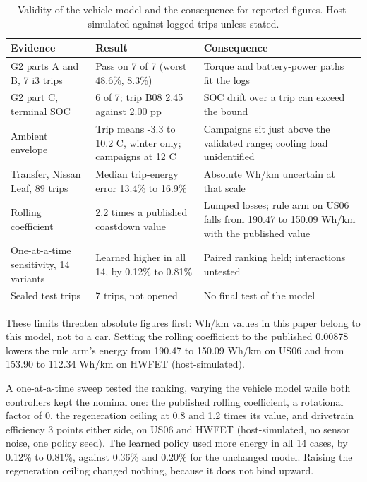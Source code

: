 \documentclass{ieeeaccess}
\begin{document}
\begin{table}[!t]
\centering
\caption{Validity of the vehicle model and the consequence for reported figures. Host-simulated against logged trips unless stated.}
\label{tab:plant-validity}
\footnotesize
\setlength{\tabcolsep}{3pt}
\renewcommand{\arraystretch}{1.15}
\begin{tabularx}{\columnwidth}{@{}XXX@{}}
\hline
\textbf{Evidence} & \textbf{Result} & \textbf{Consequence} \\
\hline
G2 parts A and B, 7 i3 trips & Pass on 7 of 7 (worst 48.6\%, 8.3\%) & Torque and battery-power paths fit the logs \\
G2 part C, terminal SOC & 6 of 7; trip B08 2.45 against 2.00 pp & SOC drift over a trip can exceed the bound \\
Ambient envelope & Trip means -3.3 to 10.2 \textdegree{}C, winter only; campaigns at 12 \textdegree{}C & Campaigns sit just above the validated range; cooling load unidentified \\
Transfer, Nissan Leaf, 89 trips & Median trip-energy error 13.4\% to 16.9\% & Absolute Wh/km uncertain at that scale \\
Rolling coefficient & 2.2 times a published coastdown value & Lumped losses; rule arm on US06 falls from 190.47 to 150.09 Wh/km with the published value \\
One-at-a-time sensitivity, 14 variants & Learned higher in all 14, by 0.12\% to 0.81\% & Paired ranking held; interactions untested \\
Sealed test trips & 7 trips, not opened & No final test of the model \\
\hline
\end{tabularx}
\end{table}

These limits threaten absolute figures first: Wh/km values in this paper belong to this model, not to a car. Setting the rolling coefficient to the published 0.00878 lowers the rule arm's energy from 190.47 to 150.09 Wh/km on US06 and from 153.90 to 112.34 Wh/km on HWFET (host-simulated).

A one-at-a-time sweep tested the ranking, varying the vehicle model while both controllers kept the nominal one: the published rolling coefficient, a rotational factor of 0, the regeneration ceiling at 0.8 and 1.2 times its value, and drivetrain efficiency 3 points either side, on US06 and HWFET (host-simulated, no sensor noise, one policy seed). The learned policy used more energy in all 14 cases, by 0.12\% to 0.81\%, against 0.36\% and 0.20\% for the unchanged model. Raising the regeneration ceiling changed nothing, because it does not bind upward.
\end{document}
